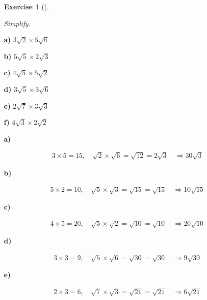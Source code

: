 \documentclass[
  letterpaper,
  DIV=11,
  numbers=noendperiod]{scrreprt}
\theoremstyle{definition}
\newtheorem{exercise}{Exercise}[chapter]
\theoremstyle{remark}
\begin{document}
\begin{exercise}[]\protect\hypertarget{exr-u2-36}{}\label{exr-u2-36}

\emph{Simplify.}

\textbf{a)} \(\displaystyle 3\sqrt{2} \times 5\sqrt{6}\)

\textbf{b)} \(\displaystyle 5\sqrt{5} \times 2\sqrt{3}\)

\textbf{c)} \(\displaystyle 4\sqrt{5} \times 5\sqrt{2}\)

\textbf{d)} \(\displaystyle 3\sqrt{5} \times 3\sqrt{6}\)

\textbf{e)} \(\displaystyle 2\sqrt{7} \times 3\sqrt{3}\)

\textbf{f)} \(\displaystyle 4\sqrt{3} \times 2\sqrt{2}\)

\begin{tcolorbox}[enhanced jigsaw, opacitybacktitle=0.6, coltitle=black, arc=.35mm, colframe=quarto-callout-tip-color-frame, colback=white, bottomrule=.15mm, left=2mm, colbacktitle=quarto-callout-tip-color!10!white, titlerule=0mm, opacityback=0, title=\textcolor{quarto-callout-tip-color}{\faLightbulb}\hspace{0.5em}{🔍 View Solutions}, leftrule=.75mm, breakable, rightrule=.15mm, bottomtitle=1mm, toptitle=1mm, toprule=.15mm]

\textbf{a)}

\[
\begin{aligned}
3\times 5=15,\quad\sqrt{2}\times\sqrt{6}=\sqrt{12}=2\sqrt{3}\quad\Rightarrow30\sqrt{3}
\end{aligned}
\]

\textbf{b)}

\[
\begin{aligned}
5\times 2=10,\quad\sqrt{5}\times\sqrt{3}=\sqrt{15}=\sqrt{15}\quad\Rightarrow10\sqrt{15}
\end{aligned}
\]

\textbf{c)}

\[
\begin{aligned}
4\times 5=20,\quad\sqrt{5}\times\sqrt{2}=\sqrt{10}=\sqrt{10}\quad\Rightarrow20\sqrt{10}
\end{aligned}
\]

\textbf{d)}

\[
\begin{aligned}
3\times 3=9,\quad\sqrt{5}\times\sqrt{6}=\sqrt{30}=\sqrt{30}\quad\Rightarrow9\sqrt{30}
\end{aligned}
\]

\textbf{e)}

\[
\begin{aligned}
2\times 3=6,\quad\sqrt{7}\times\sqrt{3}=\sqrt{21}=\sqrt{21}\quad\Rightarrow6\sqrt{21}
\end{aligned}
\]


\end{tcolorbox}
\end{exercise}
\end{document}
